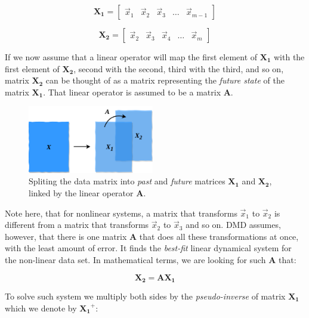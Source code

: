 \documentclass[10pt,twocolumn]{article}
\begin{document}
\begin{equation} \label{eq:X1}
\bm{X_1} = 
\begin{bmatrix}
    \vec{x}_1 & \vec{x}_2 & \vec{x}_3 & \dots & \vec{x}_{m-1}
\end{bmatrix}
\end{equation}

\begin{equation} \label{eq:X2}
\bm{X_2} = 
\begin{bmatrix}
    \vec{x}_2 & \vec{x}_3 & \vec{x}_4 & \dots & \vec{x}_{m}
\end{bmatrix}
\end{equation}

If we now assume that a linear operator will map the first element of $\bm{X_1}$ with the first element of $\bm{X_2}$, second with the second, third with the third, and so on, matrix $\bm{X_2}$ can be thought of as a matrix representing the \textit{future state} of the matrix $\bm{X_1}$. That linear operator is assumed to be a matrix $\bm{A}$. 

\begin{figure}[H]
\centering\includegraphics[width=5.5cm]{data-split.png}
\caption{Spliting the data matrix into \textit{past} and \textit{future} matrices $\bm{X_1}$ and $\bm{X_2}$, linked by the linear operator $\bm{A}$.}
\label{fig:linear_system}
\end{figure}

Note here, that for nonlinear systems, a matrix that transforms $\vec{x}_1$ to $\vec{x}_2$ is different from a matrix that transforms $\vec{x}_2$ to $\vec{x}_3$ and so on. DMD assumes, however, that there is one matrix $\bm{A}$ that does all these transformations at once, with the least amount of error. It finds the \textit{best-fit} linear dynamical system for the non-linear data set. In mathematical terms, we are looking for such $\bm{A}$ that:

\begin{equation} \label{eq:linear_dynamics}
\bm{X_2} = \bm{A} \bm{X_1}
\end{equation}

To solve such system we multiply both sides by the \textit{pseudo-inverse} of matrix $\bm{X_1}$ which we denote by $\bm{X_1}^{+}$:
\end{document}
